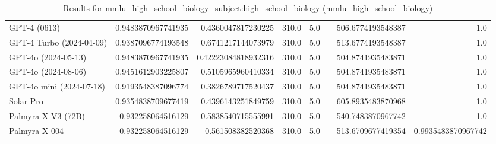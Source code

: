 \begin{table}[htp]
{\begin{tabular}{lrrrrrrr}
GPT-4 (0613) & 0.9483870967741935 & 0.4360047817230225 & 310.0 & 5.0 &  & 506.6774193548387 & 1.0 \\
GPT-4 Turbo (2024-04-09) & 0.9387096774193548 & 0.6741217144073979 & 310.0 & 5.0 &  & 513.6774193548387 & 1.0 \\
GPT-4o (2024-05-13) & 0.9483870967741935 & 0.42223084818932316 & 310.0 & 5.0 &  & 504.8741935483871 & 1.0 \\
GPT-4o (2024-08-06) & 0.9451612903225807 & 0.5105965960410334 & 310.0 & 5.0 &  & 504.8741935483871 & 1.0 \\
GPT-4o mini (2024-07-18) & 0.9193548387096774 & 0.3826789717520437 & 310.0 & 5.0 &  & 504.8741935483871 & 1.0 \\
Solar Pro & 0.9354838709677419 & 0.4396143251849759 & 310.0 & 5.0 &  & 605.8935483870968 & 1.0 \\
Palmyra X V3 (72B) & 0.932258064516129 & 0.5838540715555991 & 310.0 & 5.0 &  & 540.7483870967742 & 1.0 \\
Palmyra-X-004 & 0.932258064516129 & 0.561508382520368 & 310.0 & 5.0 &  & 513.6709677419354 & 0.9935483870967742 \\
\bottomrule
\end{tabular}}
\caption{Results for mmlu_high_school_biology_subject:high_school_biology (mmlu_high_school_biology)}
\label{fig:mmlu_high_school_biology_subject:high_school_biology (mmlu_high_school_biology)}
\end{table}